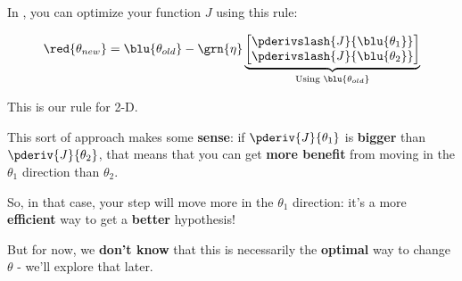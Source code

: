         \begin{kequation}
            In , you can optimize your function $J$ using this rule:
            
            \begin{equation*}
                \red{ \theta_{new} } =  \blu{ \theta_{old} } 
                - \grn{ \eta } 
                \underbrace{
                    \begin{bmatrix}
                          \pderivslash{J}{ \blu{\theta_1} } \\ 
                          \pderivslash{J}{ \blu{\theta_2} } 
                    \end{bmatrix}
                }_{ \text{Using } \blu{ \theta_{old} } }
            \end{equation*}
            
            This is our  rule for 2-D.
        \end{kequation}
        
        This sort of approach makes some \textbf{sense}: if $\pderiv{J}{\theta_1}$ is \textbf{bigger} than $\pderiv{J}{\theta_2}$, that means that you can get \textbf{more benefit} from moving in the $\theta_1$ direction than $\theta_2$.
        
        So, in that case, your step will move more in the $\theta_1$ direction: it's a more \textbf{efficient} way to get a \textbf{better} hypothesis!
        
        But for now, we \textbf{don't know} that this is necessarily the \textbf{optimal} way to change $\theta$ - we'll explore that later.